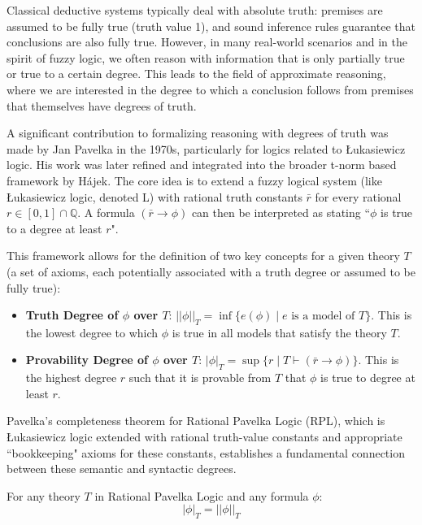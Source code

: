 Classical deductive systems typically deal with absolute truth: premises are assumed to be fully true (truth value 1), and sound inference rules guarantee that conclusions are also fully true. However, in many real-world scenarios and in the spirit of fuzzy logic, we often reason with information that is only partially true or true to a certain degree. This leads to the field of approximate reasoning, where we are interested in the degree to which a conclusion follows from premises that themselves have degrees of truth.

A significant contribution to formalizing reasoning with degrees of truth was made by Jan Pavelka in the 1970s, particularly for logics related to Łukasiewicz logic. His work was later refined and integrated into the broader t-norm based framework by Hájek. The core idea is to extend a fuzzy logical system (like Łukasiewicz logic, denoted L) with rational truth constants $\bar{r}$ for every rational $r \in [0,1] \cap \mathbb{Q}$. A formula $(\bar{r} \rightarrow \phi)$ can then be interpreted as stating ``$\phi$ is true to a degree at least $r$".

This framework allows for the definition of two key concepts for a given theory $T$ (a set of axioms, each potentially associated with a truth degree or assumed to be fully true):

\begin{itemize}
    \item \textbf{Truth Degree of $\phi$ over $T$}: $||\phi||_T = \inf\{e(\phi) \mid e \text{ is a model of } T\}$. This is the lowest degree to which $\phi$ is true in all models that satisfy the theory $T$.
    \item \textbf{Provability Degree of $\phi$ over $T$}: $|\phi|_T = \sup\{r \mid T \vdash (\bar{r} \rightarrow \phi)\}$. This is the highest degree $r$ such that it is provable from $T$ that $\phi$ is true to degree at least $r$.
\end{itemize}

Pavelka's completeness theorem for Rational Pavelka Logic (RPL), which is Łukasiewicz logic extended with rational truth-value constants and appropriate ``bookkeeping" axioms for these constants, establishes a fundamental connection between these semantic and syntactic degrees.

\begin{theorem}
For any theory $T$ in Rational Pavelka Logic and any formula $\phi$:
\[
 |\phi|_T = ||\phi||_T 
\]
\end{theorem}


